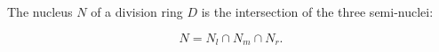 The nucleus $N$ of a division ring $D$ is the intersection of the three semi-nuclei:

$$N = N_l \cap N_m \cap N_r.$$

